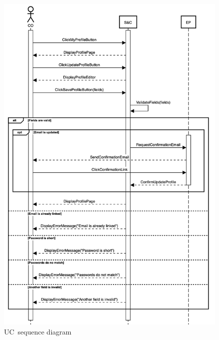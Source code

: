\begin{figure}
    \centering
    \includegraphics[width=14cm]{images/sequence-diagrams/company-updates-profile.png}
    \caption{UC\theuc\ sequence diagram}
\end{figure}


